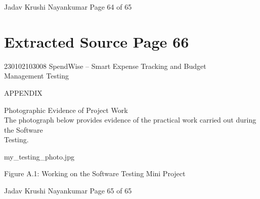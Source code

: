\documentclass[12pt,a4paper]{report}
\begin{document}
\smallskip

\smallskip

\smallskip

\smallskip
Jadav Krushi Nayankumar                                              Page 64 of 65\\ 

\clearpage
\section*{Extracted Source Page 66}
230102103008                         SpendWise – Smart Expense Tracking and Budget\\ 
Management Testing\\ 

\smallskip

\smallskip

\smallskip
APPENDIX\\ 

\smallskip

\smallskip
Photographic Evidence of Project Work\\ 

\smallskip
The photograph below provides evidence of the practical work carried out during the Software\\ 
Testing.\\ 

\smallskip

\smallskip

\smallskip

\smallskip
my\_testing\_photo.jpg\\ 

\smallskip

\smallskip

\smallskip

\smallskip
Figure A.1: Working on the Software Testing Mini Project\\ 

\smallskip

\smallskip

\smallskip

\smallskip
Jadav Krushi Nayankumar                                                     Page 65 of 65\\ 

\clearpage
\end{document}
